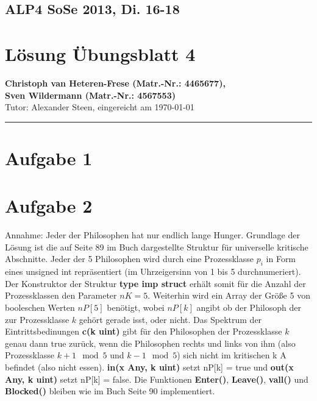 \documentclass[11pt,a4paper,DIV=10,]{scrartcl}
\begin{document}
\subsection*{ALP4 SoSe 2013, Di. 16-18}
\section*{Lösung Übungsblatt 4}
\textbf{Christoph van Heteren-Frese (Matr.-Nr.: 4465677), \\ Sven Wildermann (Matr.-Nr.: 4567553)}\\
Tutor: Alexander Steen, eingereicht am \today\\
\hrule
\section*{Aufgabe 1}


\section*{Aufgabe 2}
Annahme: Jeder der Philosophen hat nur endlich lange Hunger. 
Grundlage der Lösung ist die auf Seite 89 im Buch dargestellte Struktur für universelle kritische Abschnitte. Jeder der 5 Philosophen wird durch eine Prozessklasse $p_i$ in Form eines unsigned int repräsentiert (im Uhrzeigersinn von 1 bis 5 durchnumeriert). Der Konstruktor der Struktur \textbf{type imp struct} erhält somit für die Anzahl der Prozessklassen den Parameter $nK=5$. Weiterhin wird ein Array der Größe 5 von booleschen Werten $nP[5]$ benötigt, wobei $nP[k]$ angibt ob der Philosoph der zur Prozessklasse $k$ gehört gerade isst, oder nicht.   Das Spektrum der Eintrittsbedinungen \textbf{c(k uint)} gibt für den Philosophen der Prozessklasse $k$ genau dann true zurück, wenn die Philosophen rechts und links von ihm (also Prozessklasse $k+1 \mod 5$ und $k-1 \mod 5$) sich nicht im kritischen k A befindet (also nicht essen). \textbf{in(x Any, k uint)} setzt nP[k] = true und \textbf{out(x Any, k uint)} setzt nP[k] = false. Die Funktionen \textbf{Enter()}, \textbf{Leave()}, \textbf{vall()} und \textbf{Blocked()} bleiben wie im Buch Seite 90 implementiert.
\end{document}
